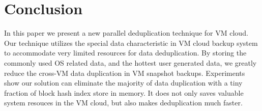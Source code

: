 \section{Conclusion}
In this paper we present a new parallel deduplication technique for VM cloud.
Our technique utilizes the special data characteristic in VM cloud backup system
to accommodate very limited resources for data deduplication.
By storing the commonly used OS related data, and the hottest user generated data, 
we greatly reduce the cross-VM data duplication in VM snapshot backups. Experiments show
our solution can eliminate the majority of data duplication with a tiny fraction of
block hash index store in memory. It does not only saves valuable system resouces in
the VM cloud, but also makes deduplication much faster.
